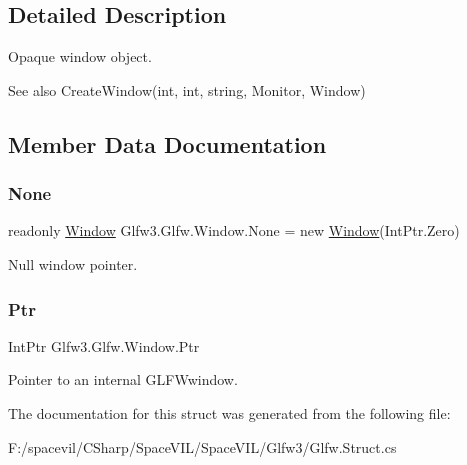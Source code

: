 \subsection{Detailed Description}


Opaque window object.

\begin{DoxySeeAlso}{See also}
Create\+Window(int, int, string, Monitor, Window)


\end{DoxySeeAlso}


\subsection{Member Data Documentation}
\mbox{\label{struct_glfw3_1_1_glfw_1_1_window_adbd0a4231a59af9e5175f77c966e9ec8}} 
\subsubsection{\texorpdfstring{None}{None}}
{\footnotesize\ttfamily readonly \mbox{\hyperlink{struct_glfw3_1_1_glfw_1_1_window}{Window}} Glfw3.\+Glfw.\+Window.\+None = new \mbox{\hyperlink{struct_glfw3_1_1_glfw_1_1_window}{Window}}(Int\+Ptr.\+Zero)\hspace{0.3cm}{\ttfamily [static]}}





Null window pointer.\mbox{\label{struct_glfw3_1_1_glfw_1_1_window_a7430cab046e77307dd5c30f153b1d25e}} 
\subsubsection{\texorpdfstring{Ptr}{Ptr}}
{\footnotesize\ttfamily Int\+Ptr Glfw3.\+Glfw.\+Window.\+Ptr}



Pointer to an internal G\+L\+F\+Wwindow. 



The documentation for this struct was generated from the following file\+:\begin{DoxyCompactItemize}
\item 
F\+:/spacevil/\+C\+Sharp/\+Space\+V\+I\+L/\+Space\+V\+I\+L/\+Glfw3/Glfw.\+Struct.\+cs\end{DoxyCompactItemize}
